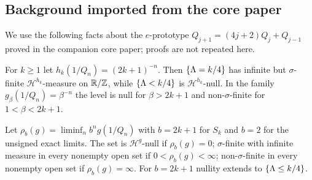 
\subsection{Background imported from the core paper}\label{sec:prereq}

We use the following facts about the $e$-prototype
$Q_{j+1}=(4j+2)Q_j+Q_{j-1}$ proved in the companion core paper;
proofs are not repeated here.

\begin{theorem}
For $k\ge1$ let $h_k(1/Q_n)=(2k+1)^{-n}$.
Then $\{\Lambda=k/4\}$ has infinite but $\sigma$-finite
$\mathcal{H}^{h_k}$-measure on $\mathbb{R}/\mathbb{Z}$, while
$\{\Lambda<k/4\}$ is $\mathcal{H}^{h_k}$-null.
In the family $g_\beta(1/Q_n)=\beta^{-n}$ the level is null for
$\beta>2k+1$ and non-$\sigma$-finite for $1<\beta<2k+1$.
\end{theorem}

\begin{corollary}
Let $\rho_b(g)=\liminf_n b^n g(1/Q_n)$ with $b=2k+1$ for
$S_k$ and $b=2$ for the unsigned exact limits.
The set is $\mathcal{H}^g$-null if $\rho_b(g)=0$;
$\sigma$-finite with infinite measure in every nonempty open set if
$0<\rho_b(g)<\infty$; non-$\sigma$-finite in every nonempty open set
if $\rho_b(g)=\infty$. For $b=2k+1$ nullity extends to
$\{\Lambda\le k/4\}$.
\end{corollary}
